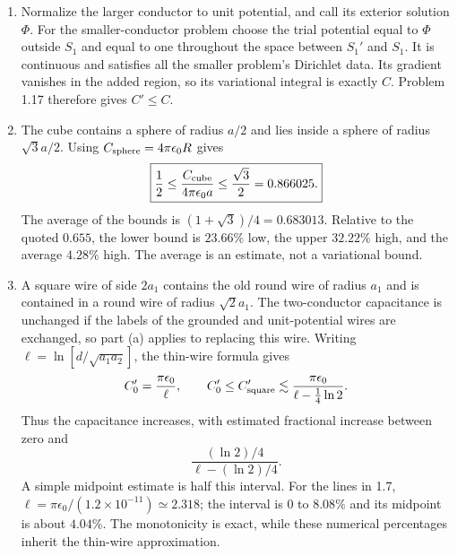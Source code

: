 \begin{enumerate}
\item[(a)] Normalize the larger conductor to unit potential, and call its
exterior solution $\Phi$. For the smaller-conductor problem choose the trial
potential equal to $\Phi$ outside $S_1$ and equal to one throughout the
space between $S_1'$ and $S_1$. It is continuous and satisfies all the
smaller problem's Dirichlet data. Its gradient vanishes in the added region,
so its variational integral is exactly $C$. Problem 1.17 therefore gives
$\boxed{C'\le C}$.
\item[(b)] The cube contains a sphere of radius $a/2$ and lies inside a sphere
of radius $\sqrt3a/2$. Using $C_{\rm sphere}=4\pi\epsilon_0R$ gives
\[
\boxed{\frac12\le\frac{C_{\rm cube}}{4\pi\epsilon_0a}\le\frac{\sqrt3}{2}
=0.866025.}
\]
The average of the bounds is $(1+\sqrt3)/4=0.683013$. Relative to the quoted
$0.655$, the lower bound is $23.66\%$ low, the upper $32.22\%$ high, and the
average $4.28\%$ high. The average is an estimate, not a variational bound.
\item[(c)] A square wire of side $2a_1$ contains the old round wire of radius
$a_1$ and is contained in a round wire of radius $\sqrt2a_1$.
The two-conductor capacitance is unchanged if the labels of the grounded and
unit-potential wires are exchanged, so part (a) applies to replacing this wire.
Writing $\ell=\ln[d/\sqrt{a_1a_2}]$, the thin-wire formula gives
\[
C'_0=\frac{\pi\epsilon_0}{\ell},\qquad
C'_0\le C'_{\rm square}\lesssim
\frac{\pi\epsilon_0}{\ell-\tfrac14\ln2}.
\]
Thus the capacitance increases, with estimated fractional increase between
zero and
\[
\frac{(\ln2)/4}{\ell-(\ln2)/4}.
\]
A simple midpoint estimate is half this interval. For the lines in 1.7,
$\ell=\pi\epsilon_0/(1.2\times10^{-11})\simeq2.318$; the interval is
$0$ to $8.08\%$ and its midpoint is about $4.04\%$.
The monotonicity is exact, while these numerical percentages inherit the
thin-wire approximation.
\end{enumerate}


